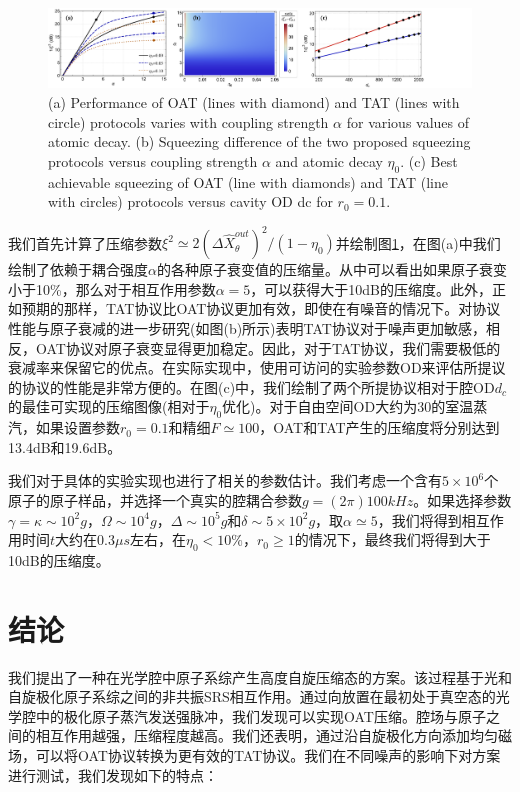 \begin{figure}[htbp]
	\centering
	\includegraphics[scale=0.26]{Img/Fig_2.pdf}
	{
		(a) Performance of OAT (lines with diamond) and TAT (lines with circle) protocols varies with coupling strength $\alpha$ for various values of atomic decay. 
		(b) Squeezing diﬀerence of the two proposed squeezing protocols versus coupling strength $\alpha$ and atomic decay $\eta_0$. 
		(c) Best achievable squeezing of OAT (line with diamonds) and TAT (line with circles) protocols versus cavity OD dc for $r_0=0.1$.}
		\label{figure42}
\end{figure}

  我们首先计算了压缩参数$\xi^2\simeq2(\Delta\hat{X}_\theta^{out})^2/(1-\eta_0)$并绘制图\ref{figure42}，在图(a)中我们绘制了依赖于耦合强度$\alpha$的各种原子衰变值的压缩量。从中可以看出如果原子衰变小于10\%，那么对于相互作用参数$\alpha=5$，可以获得大于10dB的压缩度。此外，正如预期的那样，TAT协议比OAT协议更加有效，即使在有噪音的情况下。对协议性能与原子衰减的进一步研究(如图(b)所示)表明TAT协议对于噪声更加敏感，相反，OAT协议对原子衰变显得更加稳定。因此，对于TAT协议，我们需要极低的衰减率来保留它的优点。在实际实现中，使用可访问的实验参数OD来评估所提议的协议的性能是非常方便的。在图(c)中，我们绘制了两个所提协议相对于腔OD$d_c$的最佳可实现的压缩图像(相对于$\eta_0$优化)。对于自由空间OD大约为30\cite{JPB2008qf}的室温蒸汽，如果设置参数$r_0=0.1$和精细$F\simeq100$，OAT和TAT产生的压缩度将分别达到13.4dB和19.6dB。

  我们对于具体的实验实现也进行了相关的参数估计。我们考虑一个含有$5\times 10^6$个原子的原子样品，并选择一个真实的腔耦合参数$g=(2\pi)100kHz$。如果选择参数$\gamma=\kappa\sim10^2g$，$\Omega\sim10^4g$，$\Delta\sim10^5g$和$\delta\sim5\times10^2g$，取$\alpha\simeq5$，我们将得到相互作用时间$t$大约在$0.3\mu s$左右，在$\eta_0<10\%$，$r_0\ge1$的情况下，最终我们将得到大于10dB的压缩度。
  
\vbox{}
\section{结论}
\vbox{}
  我们提出了一种在光学腔中原子系综产生高度自旋压缩态的方案。该过程基于光和自旋极化原子系综之间的非共振SRS相互作用。通过向放置在最初处于真空态的光学腔中的极化原子蒸汽发送强脉冲，我们发现可以实现OAT压缩。腔场与原子之间的相互作用越强，压缩程度越高。我们还表明，通过沿自旋极化方向添加均匀磁场，可以将OAT协议转换为更有效的TAT协议。我们在不同噪声的影响下对方案进行测试，我们发现如下的特点：

